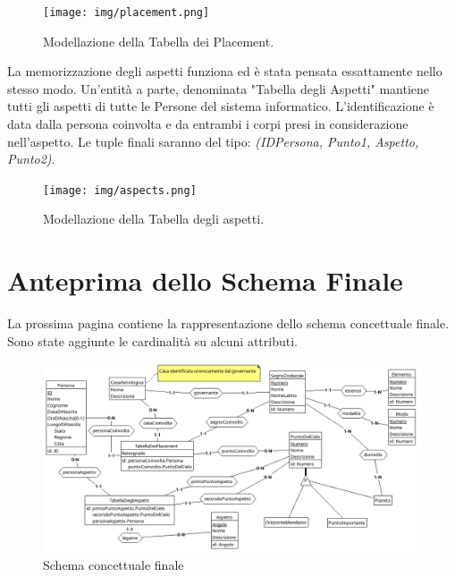 \begin{figure}[H]
\centering
\texttt{[image: img/placement.png]}
\caption{Modellazione della Tabella dei Placement.}
\label{fig:placements}
\end{figure}

La memorizzazione degli aspetti funziona ed è stata pensata essattamente nello stesso modo. Un'entità a parte, denominata "Tabella degli Aspetti" mantiene tutti gli aspetti di tutte le Persone del sistema informatico.\newline
L'identificazione è data dalla persona coinvolta e da entrambi i corpi presi in considerazione nell'aspetto.\newline
Le tuple finali saranno del tipo:\newline
\textit{(IDPersona, Punto1, Aspetto, Punto2)}.

\begin{figure}[H]
\centering
\texttt{[image: img/aspects.png]}
\caption{Modellazione della Tabella degli aspetti.}
\label{fig:aspects}
\end{figure}

\section{Anteprima dello Schema Finale}
\label{sec:finalscheme}
La prossima pagina contiene la rappresentazione dello schema concettuale finale.\newline
Sono state aggiunte le cardinalità su alcuni attributi.

\newpage

\begin{figure}
  \includegraphics[width=\textwidth,height=\textheight,keepaspectratio]{img/finalscheme.png}
  \caption{Schema concettuale finale}
  \label{fig:finalscheme}
\end{figure}

%

